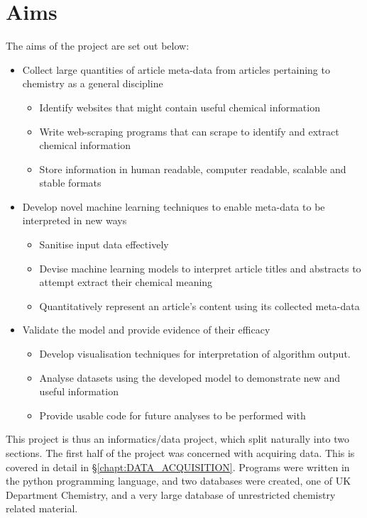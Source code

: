 \section{Aims}
The aims of the project are set out below:
\begin{itemize}
\item Collect large quantities of article meta-data from articles pertaining to chemistry as a general discipline
\begin{itemize}
\item Identify websites that might contain useful chemical information
\item Write web-scraping programs that can scrape to identify and extract chemical information
\item Store information in human readable, computer readable, scalable and stable formats
\end{itemize}
\item Develop novel machine learning techniques to enable meta-data to be interpreted in new ways
\begin{itemize}
\itemsep0em 
\item Sanitise input data effectively
\item Devise  machine learning models to interpret article titles and abstracts to attempt extract their chemical meaning
\item Quantitatively represent an article's content using its collected meta-data
\end{itemize}
\item Validate the model and provide evidence of their efficacy
\begin{itemize}
\item Develop visualisation techniques for interpretation of algorithm output.
\item Analyse datasets using the developed model to demonstrate new and useful information
\item Provide usable code for future analyses to be performed with
\end{itemize}
\end{itemize}
This project is thus an informatics/data project, which split naturally into two sections. The first half of the project was concerned with acquiring data. This is covered in detail in \S \ref{chapt:DATA_ACQUISITION}.
Programs were written in the python programming language, and two databases were created, one of UK Department Chemistry, and a very large database of unrestricted chemistry related material.


